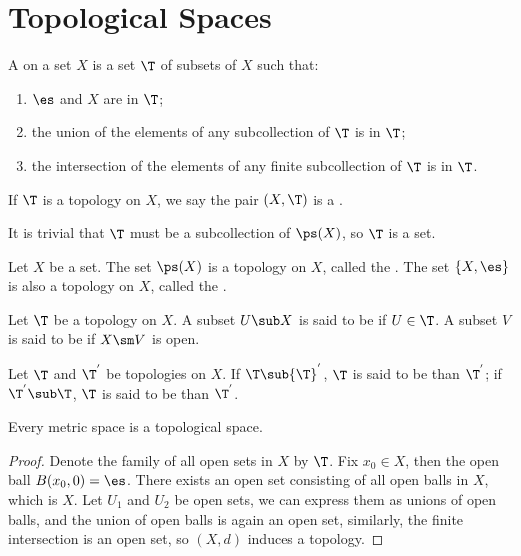 \documentclass[10pt]{article}
\begin{document}
\section{Topological Spaces}
\begin{definition}
    A  on a set $X$ is a set $\T$ of subsets of $X$ such that:
    \begin{enumerate}
        \item $\es$ and $X$ are in $\T$;
        \item the union of the elements of any subcollection of $\T$ is in $\T$;
        \item the intersection of the elements of any finite subcollection of $\T$ is in $\T$.
    \end{enumerate}
    If $\T$ is a topology on $X$, we say the pair $(X,\T)$ is a .
\end{definition}
\par
It is trivial that $\T$ must be a subcollection of $\ps(X)$, so $\T$ is a set.
\begin{example}
    Let $X$ be a set. The set $\ps(X)$ is a topology on $X$, called the . The set $\{X,\es\}$ is also a topology on $X$, called the .
\end{example}
\begin{definition}
    Let $\T$ be a topology on $X$. A subset $U\sub X$ is said to be  if $U\in\T$. A subset $V$ is said to be  if $X\sm V$ is open.
\end{definition}
\begin{definition}
    Let $\T$ and ${\T}^{'}$ be topologies on $X$. If $\T\sub{\T}^{'}$, $\T$ is said to be  than ${\T}^{'}$; if ${\T}^{'}\sub\T$, $\T$ is said to be  than ${\T}^{'}$.
\end{definition}
\begin{proposition}
    Every metric space is a topological space.
\end{proposition}
\begin{proof}
    Denote the family of all open sets in $X$ by $\T$. Fix ${x}_{0}\in X$, then the open ball $B({x}_{0},0)=\es$. There exists an open set consisting of all open balls in $X$, which is $X$. Let ${U}_{1}$ and ${U}_{2}$ be open sets, we can express them as unions of open balls, and the union of open balls is again an open set, similarly, the finite intersection is an open set, so $(X,d)$ induces a topology.
\end{proof}
\end{document}

